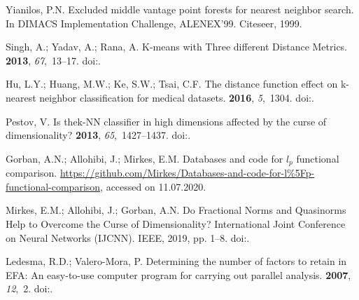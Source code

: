 \documentclass[entropy,article,submit,moreauthors,pdftex]{Definitions/mdpi}
\begin{document}
\begin{thebibliography}{-------}
Yianilos, P.N.
\newblock Excluded middle vantage point forests for nearest neighbor search.
\newblock  In DIMACS Implementation Challenge, ALENEX'99. Citeseer,  1999.

Singh, A.; Yadav, A.; Rana, A.
\newblock K-means with Three different Distance Metrics.
 {\bf 2013}, {\em 67},~13--17.
\newblock
  doi:{\href{https://doi.org/10.5120/11430-6785}{}}.

Hu, L.Y.; Huang, M.W.; Ke, S.W.; Tsai, C.F.
\newblock The distance function effect on k-nearest neighbor classification for
  medical datasets.
 {\bf 2016}, {\em 5},~1304.
\newblock
  doi:{\href{https://doi.org/10.1186/s40064-016-2941-7}{}}.

Pestov, V.
\newblock Is thek-{NN} classifier in high dimensions affected by the curse of
  dimensionality?
 {\bf 2013}, {\em 65},~1427--1437.
\newblock
  doi:{\href{https://doi.org/10.1016/j.camwa.2012.09.011}{}}.

Gorban, A.N.; Allohibi, J.; Mirkes, E.M.
\newblock Databases and code for $l_p$ functional comparison.
\newblock
  \url{https://github.com/Mirkes/Databases-and-code-for-l%5Fp-functional-comparison},
  accessed on 11.07.2020.

Mirkes, E.M.; Allohibi, J.; Gorban, A.N.
\newblock Do Fractional Norms and Quasinorms Help to Overcome the Curse of
  Dimensionality?
 International Joint Conference on Neural Networks (IJCNN).
  IEEE,  2019, pp. 1--8.
\newblock
  doi:{\href{https://doi.org/10.1109/ijcnn.2019.8851899}{}}.

Ledesma, R.D.; Valero-Mora, P.
\newblock Determining the number of factors to retain in EFA: An easy-to-use
  computer program for carrying out parallel analysis.
 {\bf 2007}, {\em 12},~2.
\newblock
  doi:{\href{https://doi.org/10.7275/wjnc-nm63}{}}.


\end{thebibliography}
\end{document}
